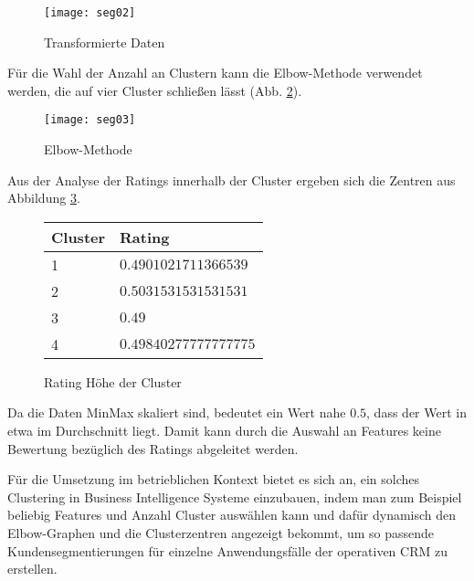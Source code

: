 \begin{figure}[ht]
  \centering
  \texttt{[image: seg02]}
  \caption{Transformierte Daten}
  \label{fig:seg02}
\end{figure}

Für die Wahl der Anzahl an Clustern kann die Elbow-Methode verwendet werden, die auf vier Cluster schließen lässt (Abb. \ref{fig:seg03}).

\begin{figure}[ht]
  \centering
  \texttt{[image: seg03]}
  \caption{Elbow-Methode}
  \label{fig:seg03}
\end{figure}

Aus der Analyse der Ratings innerhalb der Cluster ergeben sich die Zentren aus Abbildung \ref{fig:clusrating}.

\begin{figure}[H]
  \centering
  \begin{tabular}{l | l}
    Cluster & Rating\\
    \hline
    1 & $0.4901021711366539$\\
    2 & $0.5031531531531531$\\
    3 & $0.49$\\
    4 & $0.49840277777777775$
  \end{tabular}
  \caption{Rating Höhe der Cluster}
  \label{fig:clusrating}
\end{figure}

Da die Daten MinMax skaliert sind, bedeutet ein Wert nahe $0.5$, dass der Wert in etwa im Durchschnitt liegt.
Damit kann durch die Auswahl an Features keine Bewertung bezüglich des Ratings abgeleitet werden.

Für die Umsetzung im betrieblichen Kontext bietet es sich an, ein solches Clustering in Business Intelligence Systeme einzubauen, indem man zum Beispiel beliebig Features und Anzahl Cluster auswählen kann und dafür dynamisch den Elbow-Graphen und die Clusterzentren angezeigt bekommt, um so passende Kundensegmentierungen für einzelne Anwendungsfälle der operativen CRM zu erstellen.
